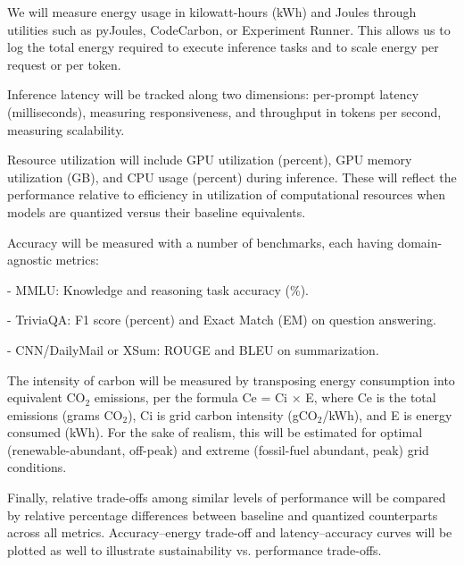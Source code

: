 We will measure energy usage in kilowatt-hours (kWh) and Joules through utilities such as pyJoules, CodeCarbon, or Experiment Runner. This allows us to log the total energy required to execute inference tasks and to scale energy per request or per token.

Inference latency will be tracked along two dimensions: per-prompt latency (milliseconds), measuring responsiveness, and throughput in tokens per second, measuring scalability.

Resource utilization will include GPU utilization (percent), GPU memory utilization (GB), and CPU usage (percent) during inference. These will reflect the performance relative to efficiency in utilization of computational resources when models are quantized versus their baseline equivalents.

Accuracy will be measured with a number of benchmarks, each having domain-agnostic metrics:

- MMLU: Knowledge and reasoning task accuracy (\%).

- TriviaQA: F1 score (percent) and Exact Match (EM) on question answering.

- CNN/DailyMail or XSum: ROUGE and BLEU on summarization.

The intensity of carbon will be measured by transposing energy consumption into equivalent CO$_2$ emissions, per the formula Ce = Ci × E, where Ce is the total emissions (grams CO$_2$), Ci is grid carbon intensity (gCO$_2$/kWh), and E is energy consumed (kWh). For the sake of realism, this will be estimated for optimal (renewable-abundant, off-peak) and extreme (fossil-fuel abundant, peak) grid conditions.

Finally, relative trade-offs among similar levels of performance will be compared by relative percentage differences between baseline and quantized counterparts across all metrics. Accuracy–energy trade-off and latency–accuracy curves will be plotted as well to illustrate sustainability vs. performance trade-offs.





